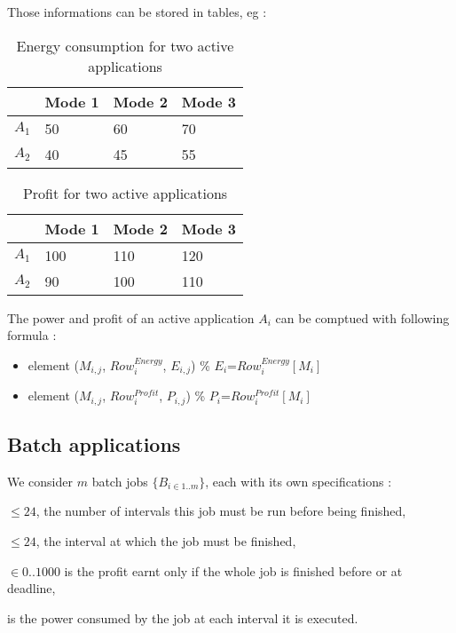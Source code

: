 \documentclass[a4paper]{article}
\begin{document}
Those informations can be stored in tables, eg :

\begin{table}[H]
\begin{center}
  \begin{tabular}{ | l | l | l | l |}
     \hline
      & Mode 1 & Mode 2 & Mode 3 \\ \hline
    $A_1$ & 50 & 60 & 70 \\ \hline
    $A_2$ & 40 & 45 & 55 \\
    \hline
    \end{tabular}
\end{center}
\caption{Energy consumption for two active applications}
\end{table}

\begin{table}[H]
\begin{center}
    \begin{tabular}{ | l | l | l | l |}
    \hline
      & Mode 1 & Mode 2 & Mode 3 \\ \hline
    $A_1$ & 100 & 110 & 120 \\ \hline
    $A_2$ & 90 & 100 & 110 \\
    \hline
    \end{tabular}
\end{center}
\caption{Profit for two active applications}
\end{table}

The power and profit of an active application $A_i$ can be comptued with following formula :
\begin{itemize}
 \item element ($M_{i,j}$, $Row^{Energy}_{i}$, $E_{i,j}$) \% \quad $E_i$=$Row^{Energy}_{i} [M_i]$
 \item element ($M_{i,j}$, $Row^{Profit}_{i}$, $P_{i,j}$) \% \quad $P_i$=$Row^{Profit}_{i} [M_i]$
\end{itemize}


\subsection{Batch applications}

We consider $m$ batch jobs $\{B_{i \in1..m}\}$, each with its own specifications :

\begin{description}[labelwidth=4em,align=left,labelindent=2em]
\item [$Duration_i$] $\le24$, the number of intervals this job must be run before being finished,
\item [$Deadline_i$] $\le24$, the interval at which the job must be finished,
\item [$Pbmax_i$] $\in 0..1000$ is the profit earnt only if the whole job is finished before or at deadline,
\item [$Eb_i$] is the power consumed by the job at each interval it is executed.
\end{description}
\end{document}
